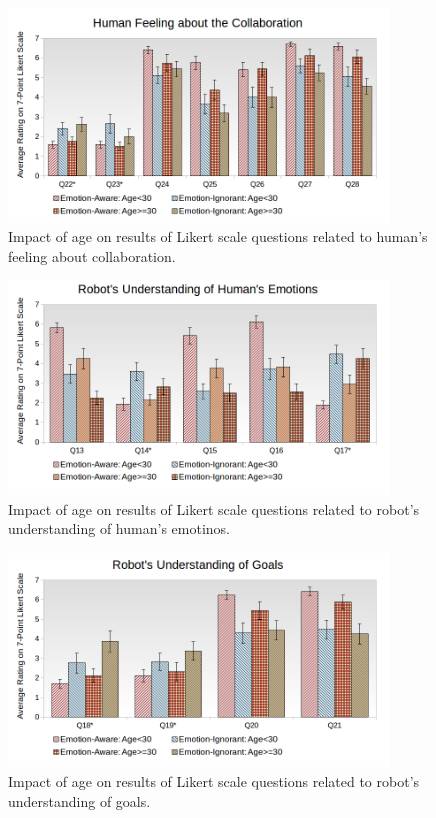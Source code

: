 \documentclass[12pt]{report}
\begin{document}
\begin{figure}[tbh]
\centering
\includegraphics[width=0.9\textwidth]{figure/Age-Collaboration.png}
\caption{Impact of age on results of Likert scale questions related to
human's feeling about collaboration.}
\label{fig:age-collaboration}
\end{figure}

\begin{figure}[tbh]
\centering
\includegraphics[width=0.9\textwidth]{figure/Age-Emotions.png}
\caption{Impact of age on results of Likert scale questions related to
robot's understanding of human's emotinos.}
\label{fig:age-emotions}
\end{figure}

\begin{figure}[tbh]
\centering
\includegraphics[width=0.9\textwidth]{figure/Age-Goals.png}
\caption{Impact of age on results of Likert scale questions related to
robot's understanding of goals.}
\label{fig:age-goals}
\end{figure}
\end{document}
